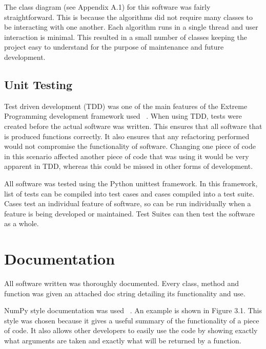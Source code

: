 \documentclass{UoYCSproject}
\begin{document}
The class diagram (see Appendix A.1) for this software was fairly straightforward. This is because the algorithms did not require many classes to be interacting with one another. Each algorithm runs in a single thread and user interaction is minimal. This resulted in a small number of classes keeping the project easy to understand for the purpose of maintenance and future development.
 
\subsection{Unit Testing}
Test driven development (TDD) was one of the main features of the Extreme Programming development framework used  ~\parencite{janzen2005test}. When using TDD, tests were created before the actual software was written. This ensures that all software that is produced functions correctly. It also ensures that any refactoring performed would not compromise the functionality of software. Changing one piece of code in this scenario affected another piece of code that was using it would be very apparent in TDD, whereas this could be missed in other forms of development.

All software was tested using the Python unittest framework. In this framework, list of tests can be compiled into test cases and cases compiled into a test suite. Cases test an individual feature of software, so can be run individually when a feature is being developed or maintained. Test Suites can then test the software as a whole.

\section{Documentation}
All software written was thoroughly documented. Every class, method and function was given an attached doc string detailing its functionality and use.

NumPy style documentation was used ~\parencite{Numpy}. An example is shown in Figure 3.1. This style was chosen because it gives a useful summary of the functionality of a piece of code. It also allows other developers to easily use the code by showing exactly what arguments are taken and exactly what will be returned by a function.
\end{document}
